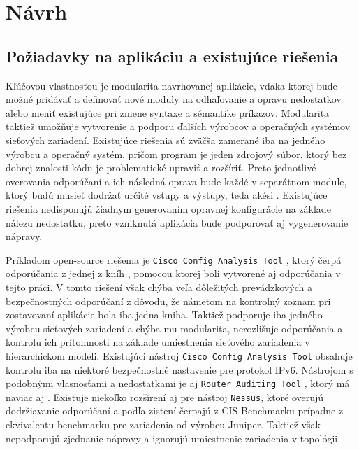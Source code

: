 \chapter{Návrh}

\section{Požiadavky na aplikáciu a existujúce riešenia}
Kľúčovou vlastnosťou je modularita navrhovanej aplikácie, vďaka ktorej bude možné pridávať a definovať nové moduly na odhaľovanie a opravu nedostatkov alebo meniť existujúce pri zmene syntaxe a sémantike príkazov. Modularita taktiež umožňuje vytvorenie a podporu ďalších výrobcov a operačných systémov sieťových zariadení. Existujúce riešenia sú zväčša zamerané iba na jedného výrobcu a operačný systém, pričom program je jeden zdrojový súbor, ktorý bez dobrej znalosti kódu je problematické upraviť a rozšíriť. Preto jednotlivé overovania odporúčaní a ich následná oprava bude každé v separátnom module, ktorý budú musieť dodržať určité vstupy a výstupy, teda akési . Existujúce riešenia nedisponujú žiadnym generovaním opravnej konfigurácie na základe nálezu nedostatku, preto vzniknutá aplikácia bude podporovať aj vygenerovanie nápravy.

Príkladom open-source riešenia je \texttt{Cisco Config Analysis Tool} \cite{AU81CvNW4q8RGnqM}, ktorý čerpá odporúčania z jednej z kníh \cite{Singh2018}, pomocou ktorej boli vytvorené aj odporúčania v tejto práci. V tomto riešení však chýba veľa dôležitých prevádzkových a bezpečnostných odporúčaní z dôvodu, že námetom na kontrolný zoznam pri zostavovaní aplikácie bola iba jedna kniha. Taktiež podporuje iba jedného výrobcu sieťových zariadení a chýba mu modularita, nerozlišuje odporúčania a kontrolu ich prítomnosti na základe umiestnenia sieťového zariadenia v hierarchickom modeli. Existujúci nástroj \texttt{Cisco Config Analysis Tool} obsahuje kontrolu iba na niektoré bezpečnostné nastavenie pre protokol IPv6. Nástrojom s podobnými vlasnosťami a nedostatkami je aj \texttt{Router Auditing Tool} \cite{OniomAfGpef53LHq}, ktorý má naviac aj . Existuje niekoľko rozšírení aj pre nástroj \texttt{Nessus}, ktoré overujú dodržiavanie odporúčaní a podľa zistení čerpajú z CIS Benchmarku \cite{CIS_DrTLsgXv24lxeIIM} prípadne z ekvivalentu benchmarku pre zariadenia od výrobcu Juniper. Taktiež však nepodporujú zjednanie nápravy a ignorujú umiestnenie zariadenia v topológii.     

